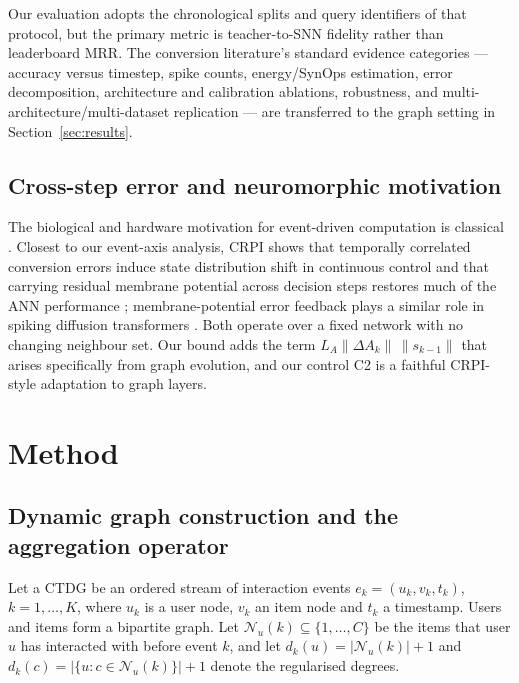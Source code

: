 \documentclass[preprint,12pt]{elsarticle}
\begin{document}
Our evaluation adopts the chronological splits and query identifiers of that protocol, but the primary metric is teacher-to-SNN fidelity rather than leaderboard MRR. The conversion literature's standard evidence categories --- accuracy versus timestep, spike counts, energy/SynOps estimation, error decomposition, architecture and calibration ablations, robustness, and multi-architecture/multi-dataset replication \cite{bu2022qcfs,cos2023offset,huang2025dcgs,sengupta2019going} --- are transferred to the graph setting in Section~\ref{sec:results}.

\subsection{Cross-step error and neuromorphic motivation}

The biological and hardware motivation for event-driven computation is classical \cite{maass1997,akopyan2015truenorth,davies2018loihi}. Closest to our event-axis analysis, CRPI shows that temporally correlated conversion errors induce state distribution shift in continuous control and that carrying residual membrane potential across decision steps restores much of the ANN performance \cite{xu2026crpi}; membrane-potential error feedback plays a similar role in spiking diffusion transformers \cite{fang2026mpef}. Both operate over a fixed network with no changing neighbour set. Our bound adds the term $L_A\|\Delta A_k\|\,\|s_{k-1}\|$ that arises specifically from graph evolution, and our control C2 is a faithful CRPI-style adaptation to graph layers.

\section{Method}
\label{sec:method}

\subsection{Dynamic graph construction and the aggregation operator}
\label{sec:graph}

Let a CTDG be an ordered stream of interaction events $e_k=(u_k,v_k,t_k)$, $k=1,\ldots,K$, where $u_k$ is a user node, $v_k$ an item node and $t_k$ a timestamp. Users and items form a bipartite graph. Let $\mathcal N_u(k)\subseteq\{1,\ldots,C\}$ be the items that user $u$ has interacted with before event $k$, and let $d_k(u)=|\mathcal N_u(k)|+1$ and $d_k(c)=|\{u: c\in\mathcal N_u(k)\}|+1$ denote the regularised degrees.
\end{document}
